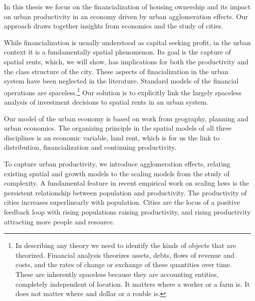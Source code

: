 In this thesis we focus on the financialization of housing ownership and its impact on urban productivity in an economy driven by urban agglomeration effects. 
Our approach draws together insights from economics and the study of cities. 

While financialization is usually understood as capital seeking profit, in the urban context it is a fundamentally spatial phenomenon. %
Its goal is the capture of spatial rents, which, we will show, has implications for both the productivity and the class structure of the city. These aspects of finacialization in the urban system have been neglected in the literature. Standard models of the financial operations are spaceless.\footnote{In describing any theory we need to identify the kinds of objects that are theorized. Financial analysis theorizes  assets, debts, flows of revenue and costs, and the rates of change or exchange of these quantities over time. These are inherently spaceless because they are accounting entities, completely independent of location. It matters where a worker or a farm is. It does not matter where and dollar or a rouble is.} 
Our solution is to explicitly link the largely spaceless analysis of investment decisions to spatial rents in an urban system. 

Our model of the urban economy is based on work from %
geography, planning and urban economics. 
The organizing principle in the spatial models of all three disciplines is an economic variable, land rent, which is for us the link to distribution, financialization and continuing productivity. %

To capture urban productivity, we introduce %
agglomeration effects, relating existing spatial and growth models to the scaling models from the study of complexity. A fundamental feature in recent empirical work on scaling laws is %
the persistent relationship between population and productivity. The productivity of cities increases superlinearly with population. Cities are the locus of a positive feedback loop with rising populations raising productivity, and rising productivity attracting more people and resource.

